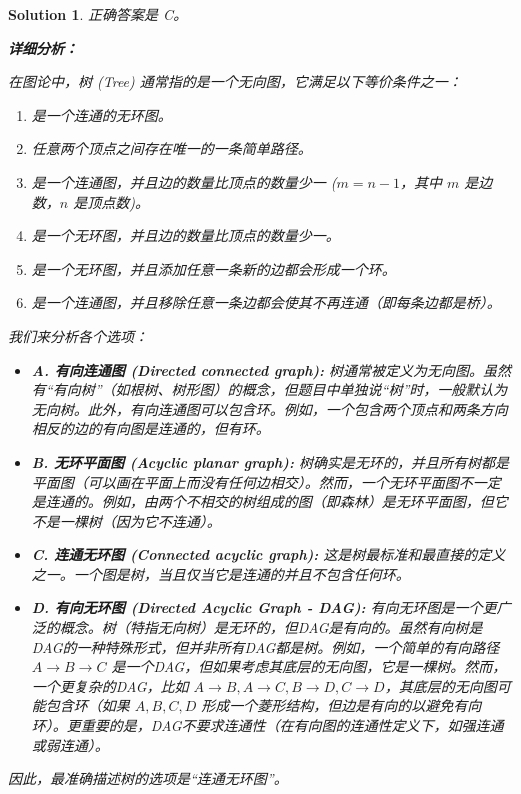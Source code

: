 \documentclass[UTF8]{report}
\newtheorem{solution}{Solution}
\theoremstyle{MyLineTheoremStyle} %
\theoremstyle{MyBlockTheoremStyle} %
\theoremstyle{MySubsubsectionStyle} %
\begin{document}
\begin{solution}
正确答案是 C。

\textbf{详细分析：}

在图论中，树 (Tree) 通常指的是一个无向图，它满足以下等价条件之一：
\begin{enumerate}
    \item 是一个连通的无环图。
    \item 任意两个顶点之间存在唯一的一条简单路径。
    \item 是一个连通图，并且边的数量比顶点的数量少一 ($m = n-1$，其中 $m$ 是边数，$n$ 是顶点数)。
    \item 是一个无环图，并且边的数量比顶点的数量少一。
    \item 是一个无环图，并且添加任意一条新的边都会形成一个环。
    \item 是一个连通图，并且移除任意一条边都会使其不再连通（即每条边都是桥）。
\end{enumerate}

我们来分析各个选项：
\begin{itemize}
    \item \textbf{A. 有向连通图 (Directed connected graph):}
        树通常被定义为无向图。虽然有“有向树”（如根树、树形图）的概念，但题目中单独说“树”时，一般默认为无向树。此外，有向连通图可以包含环。例如，一个包含两个顶点和两条方向相反的边的有向图是连通的，但有环。

    \item \textbf{B. 无环平面图 (Acyclic planar graph):}
        树确实是无环的，并且所有树都是平面图（可以画在平面上而没有任何边相交）。然而，一个无环平面图不一定是连通的。例如，由两个不相交的树组成的图（即森林）是无环平面图，但它不是一棵树（因为它不连通）。

    \item \textbf{C. 连通无环图 (Connected acyclic graph):}
        这是树最标准和最直接的定义之一。一个图是树，当且仅当它是连通的并且不包含任何环。

    \item \textbf{D. 有向无环图 (Directed Acyclic Graph - DAG):}
        有向无环图是一个更广泛的概念。树（特指无向树）是无环的，但DAG是有向的。虽然有向树是DAG的一种特殊形式，但并非所有DAG都是树。例如，一个简单的有向路径 $A \rightarrow B \rightarrow C$ 是一个DAG，但如果考虑其底层的无向图，它是一棵树。然而，一个更复杂的DAG，比如 $A \rightarrow B, A \rightarrow C, B \rightarrow D, C \rightarrow D$，其底层的无向图可能包含环（如果 $A,B,C,D$ 形成一个菱形结构，但边是有向的以避免有向环）。更重要的是，DAG不要求连通性（在有向图的连通性定义下，如强连通或弱连通）。
\end{itemize}

因此，最准确描述树的选项是“连通无环图”。
\end{solution}
\end{document}
